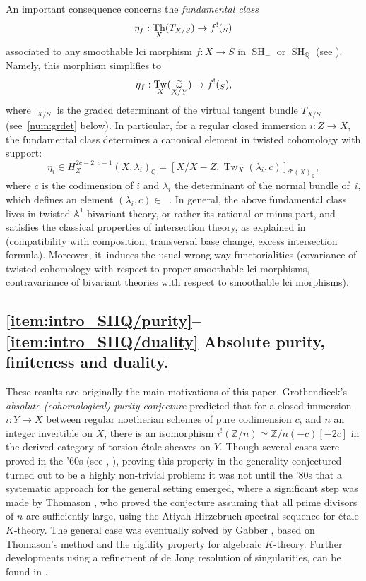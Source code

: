 \documentclass[11pt]{article}
\makeatletter
\numberwithin{equation}{section}\renewcommand{\encodingdefault}{TU}
\DeclareRobustCommand{\mathbbm}[1]{\csname jepbb@#1\endcsname}
\newcommand{\T}{\mathscr T}
\DeclareMathOperator{\uPic}{\underline{Pic}}
\renewcommand{\AA}{\mathbb A}
\newcommand{\un}{\mathbbm 1}
\DeclareMathOperator{\SH}{SH}
\DeclareMathOperator{\Th}{Th}
\DeclareMathOperator{\Tw}{Tw}
\DeclareMathOperator{\tomega}{\widetilde \omega}
\newcommand{\QQ} {\mathbb Q}
\theoremstyle{remark}
\theoremstyle{definition}
\numberwithin{equation}{thm}
\makeatother
\begin{document}
An important consequence concerns the \emph{fundamental class}
\[
\eta_f : \Th_X(T_{X/S}) \to f^!(\un_S)
\]
associated to any smoothable lci morphism $f : X \to S$ in $\SH_-$ or $\SH_\QQ$ (see \cite[4.3.4]{DJK}).
Namely, this morphism simplifies to
\[
\eta_f : \Tw_X(\tomega_{X/Y}) \to f^!(\un_S),
\]
where $\tomega_{X/S}$ is the graded determinant of the virtual tangent bundle $T_{X/S}$ (see~\ref{num:grdet} below).
In particular, for a regular closed immersion $i : Z \to X$, the fundamental class determines a canonical element in twisted cohomology with support:
\[
\eta_i
\in H^{2c-2,c-1}_Z(X,\lambda_i)_\QQ
= [X/X-Z,\Tw_X(\lambda_i,c)]_{\T(X)_\QQ},
\]
where $c$ is the codimension of $i$ and $\lambda_i$ the determinant of the normal bundle of~$i$, which defines an element $(\lambda_i,c)\in \uPic$. In general, the above fundamental class lives in twisted $\AA^1$-bivariant theory, or rather its rational or minus part, and satisfies the classical properties of intersection theory, as explained in \cite{DJK} (compatibility with composition, transversal base change, excess intersection formula).
Moreover, it~induces the usual wrong-way functorialities (covariance of twisted cohomology with respect to proper smoothable lci morphisms, contravariance of bivariant theories with respect to smoothable lci morphisms).

\subsection*{\eqref{item:intro_SHQ/purity}--\eqref{item:intro_SHQ/duality} Absolute purity, finiteness and duality.}
These results are originally the main motivations of this paper.
Grothendieck's \emph{absolute (cohomological) purity conjecture} \cite[I\,3.1.4]{SGA5} predicted that for a closed immersion $i:Y\to X$ between regular noetherian schemes of pure codimension $c$, and $n$ an integer invertible on $X$, there is an isomorphism $i^!(\mathbb{Z}/n)\simeq \mathbb{Z}/n(-c)[-2c]$ in the derived category of torsion étale sheaves on $Y$.
Though several cases were proved in the '60s (see \cite[I\,5.1]{SGA5}, \cite[XVIII\,3.2.5]{SGA4}), proving this property in the generality conjectured turned out to be a highly non-trivial problem: it was not until the '80s that a systematic approach for the general setting emerged, where a significant step was made by Thomason \cite{Thomason1}, who proved the conjecture assuming that all prime divisors of $n$ are sufficiently large, using the Atiyah-Hirzebruch spectral sequence for étale $K$-theory.
The general case was eventually solved by Gabber \cite{Fuji}, based on Thomason's method and the rigidity property for algebraic $K$-theory.
Further developments using a refinement of de Jong resolution of singularities, can be found in \cite[Exp.\,XVI]{Gabber}.
\end{document}
